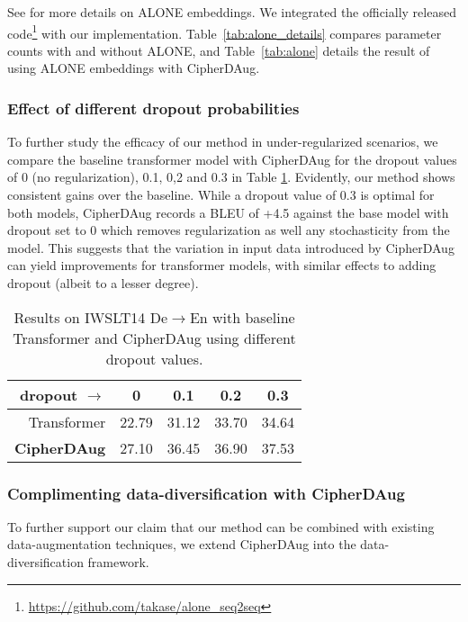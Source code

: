 \documentclass[11pt]{article}
\begin{document}
See \citet{alone-neurips20} for more details on ALONE embeddings. We integrated the officially released code\footnote{\url{https://github.com/takase/alone\_seq2seq}} with our implementation. Table~\ref{tab:alone_details} compares parameter counts with and without ALONE, and Table~\ref{tab:alone} details the result of using ALONE embeddings with CipherDAug.



\subsubsection{Effect of different dropout probabilities}
To further study the efficacy of our method in under-regularized scenarios, we compare the baseline transformer model with CipherDAug for the dropout values of 0 (no regularization), 0.1, 0,2 and 0.3 in Table \ref{tab:dropout_compare}. Evidently, our method shows consistent gains over the baseline. While a dropout value of 0.3 is optimal for both models, CipherDAug records a BLEU of +4.5 against the base model with dropout set to 0 which removes regularization as well any stochasticity from the model. 
This suggests that the variation in input data introduced by CipherDAug can yield improvements for transformer models, with similar effects to adding dropout (albeit to a lesser degree).

\begin{table}[ht]
\small
\centering
\begin{tabular}{rcccc}
\toprule
\textbf{dropout $\rightarrow$} & \textbf{0} & \textbf{0.1} & \textbf{0.2} & \textbf{0.3} \\ \midrule
Transformer & 22.79 & 31.12 & 33.70 & 34.64 \\
\textbf{CipherDAug} & 27.10 & 36.45 & 36.90 & 37.53 \\
\bottomrule
\end{tabular}
\caption{Results on IWSLT14 De$\rightarrow$En with baseline Transformer and CipherDAug using different dropout values.}
\label{tab:dropout_compare}
\end{table}

\subsubsection{Complimenting data-diversification with CipherDAug}\label{sec:data-diverse-combine}
To further support our claim that our method can be combined with existing data-augmentation techniques, we extend CipherDAug into the data-diversification \cite{nguyen19datadiverse} framework.
\end{document}

